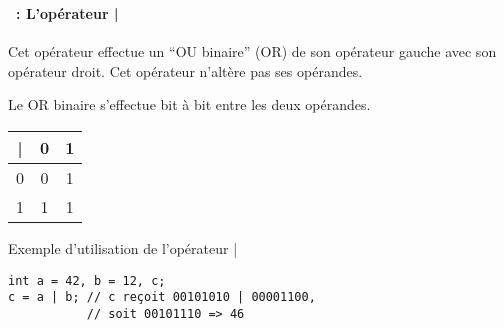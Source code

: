 \begin{frame}[containsverbatim]
  \frametitle{\secname}
  \framesubtitle{\subsecname~: L'opérateur |} 

  Cet opérateur effectue un ``OU binaire'' (OR) de son opérateur gauche avec son opérateur droit. Cet opérateur n'altère pas ses opérandes.
  \vspace{0.3cm}
  \par
  Le OR binaire s'effectue bit à bit entre les deux opérandes.
  \par
  \begin{center}
    \begin{tabular}{|c|c|c|}
      \hline
      | & 0 & 1 \\
      \hline
      0  & 0 & 1 \\
      \hline
      1  & 1 & 1 \\
      \hline
    \end{tabular}
  \end{center}
  \begin{exampleblock}{Exemple d'utilisation de l'opérateur |}
    \begin{verbatim}
int a = 42, b = 12, c;
c = a | b; // c reçoit 00101010 | 00001100, 
           // soit 00101110 => 46\end{verbatim}
  \end{exampleblock}
\end{frame}

